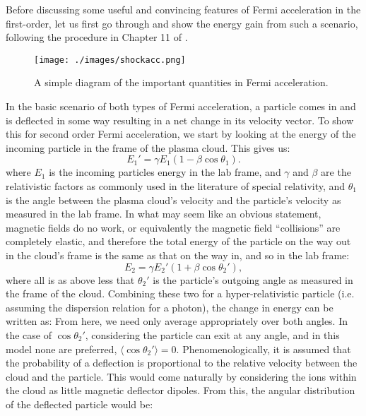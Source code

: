 Before discussing some useful and convincing features of Fermi acceleration in the first-order, let us first go through and show the energy gain from such a scenario, following the procedure in Chapter 11 of \textcite{crapp}.
\begin{figure}[h!]
\begin{center}
\texttt{[image: ./images/shockacc.png]}
\begin{singlespace}
\caption[Shock Acceleration]{A simple diagram of the important quantities in Fermi acceleration.}
\end{singlespace}
\label{shockacc}
\end{center}
\end{figure}
In the basic scenario of both types of Fermi acceleration, a particle comes in and is deflected in some way resulting in a net change in its velocity vector. To show this for second order Fermi acceleration, we start by looking at the energy of the incoming particle in the frame of the plasma cloud. This gives us:
$$ E_1'=\gamma E_1(1-\beta \cos\theta_1). $$
where $E_1$ is the incoming particles energy in the lab frame, and $\gamma$ and $\beta$ are the relativistic factors as commonly used in the literature of special relativity, and $\theta_1$ is the angle between the plasma cloud's velocity and the particle's velocity as measured in the lab frame. In what may seem like an obvious statement, magnetic fields do no work, or equivalently the magnetic field ``collisions'' are completely elastic, and therefore the total energy of the particle on the way out in the cloud's frame is the same as that on the way in, and so in the lab frame:
$$ E_2=\gamma E_2'(1+\beta\cos\theta_2'),$$ 
where all is as above less that $\theta_2'$ is the particle's outgoing angle as measured in the frame of the cloud. Combining these two for a hyper-relativistic particle (i.e. assuming the dispersion relation for a photon), the change in energy can be written as:
From here, we need only average appropriately over both angles. In the case of $\cos \theta_2'$, considering the particle can exit at any angle, and in this model none are preferred, $\langle\cos \theta_2'\rangle=0$. Phenomenologically, it is assumed that the probability of a deflection is proportional to the relative velocity between the cloud and the particle. This would come naturally by considering the ions within the cloud as little magnetic deflector dipoles. From this, the angular distribution of the deflected particle would be:
